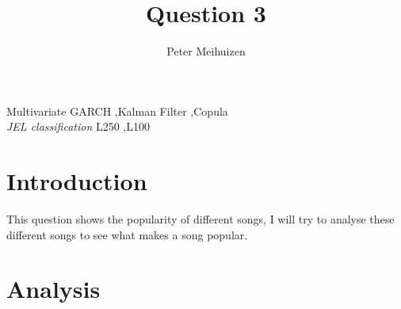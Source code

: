 \documentclass[11pt,preprint, authoryear]{elsarticle}
\numberwithin{equation}{section}
\numberwithin{figure}{section}
\numberwithin{table}{section}
\begin{document}
\begin{frontmatter}  %

\title{Question 3}





\author[Add1]{Peter Meihuizen}





\address[Add1]{Stellenbosch University}



\vspace{1cm}


\begin{keyword}
\footnotesize{
Multivariate GARCH \sep Kalman Filter \sep Copula \\
\vspace{0.3cm}
}
\footnotesize{
\textit{JEL classification} L250 \sep L100
}
\end{keyword}



\vspace{0.5cm}

\end{frontmatter}

\setcounter{footnote}{0}



\pagestyle{fancy}
\chead{}
\rhead{}
\lfoot{}
\lhead{}
\cfoot{}


\headsep 35pt %




\hypertarget{introduction}{%
\section{\texorpdfstring{Introduction
\label{Introduction}}{Introduction }}\label{introduction}}

This question shows the popularity of different songs, I will try to
analyse these different songs to see what makes a song popular.

\hypertarget{analysis}{%
\section{\texorpdfstring{Analysis
\label{Analysis}}{Analysis }}\label{analysis}}
\end{document}
